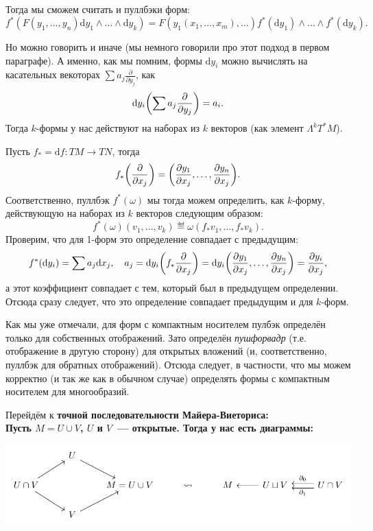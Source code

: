  	Тогда мы сможем считать и пуллбэки форм: 
 	\[
 		f^{*}(F(y_1, \ldots, y_n) \mathrm{d}y_1 \wedge \ldots \wedge \mathrm{d}y_k) = F(y_1(x_1, \ldots, x_m), \ldots) f^{*}(\mathrm{d}y_1) \wedge \ldots \wedge f^{*}(\mathrm{d}y_k).
 	\]

 	Но можно говорить и иначе (мы немного говорили про этот подход в первом параграфе). А именно, как мы помним, формы $\mathrm{d}y_i$ можно вычислять на касательных векоторах $\sum a_j \frac{\partial}{\partial y_j}$, как 
 	\[
 		\mathrm{d} y_i \lr*{\sum a_j \frac{\partial}{\partial y_j}} = a_i. 
 	\]
 	Тогда $k$-формы у нас действуют на наборах из $k$ векторов (как элемент $\Lambda^k T^*M$).

 	Пусть $f_* = \mathrm{d}f\colon TM \to TN$, тогда 
 	\[
 	 	f_*\lr*{\frac{\partial}{\partial x_j}} = \lr*{ \frac{\partial y_1}{\partial x_j}, \ldots, \frac{\partial y_n}{\partial x_j} }. 
 	 \] 
 	 Соответственно, пуллбэк  $f^*(\omega)$ мы тогда можем определить, как $k$-форму, действующую на наборах из $k$ векторов следующим образом: 
 	 \[
 	 	f^*(\omega)(v_1, \ldots, v_k) \eqdef \omega(f_*v_1, \ldots, f_* v_k). 
 	 \]
 	 Проверим, что для 1-форм это определение совпадает с предыдущим: 
 	 \[
 	 	f^*(\mathrm{d}y_i) = \sum a_j \mathrm{d}x_j, \quad a_j = \mathrm{d}y_i\lr*{f_* \frac{\partial}{\partial x_j}} = \mathrm{d}y_i\lr*{ \frac{\partial y_1}{\partial x_j}, \ldots, \frac{\partial y_n}{\partial x_j} } = \frac{\partial y_i}{\partial x_j},
 	 \]
 	  а этот коэффициент совпадает с тем, который был в предыдущем определении. Отсюда сразу следует, что это определение совпадает предыдущим и для  $k$-форм. 

 	  \begin{remark} 
 	  	Как мы уже отмечали, для форм с компактным носителем пулбэк определён только для собственных отображений. Зато определён \emph{пушфорвадр} (т.е. отображение в другую сторону) для открытых вложений (и, соответственно, пуллбэк для обратных отображений). Отсюда следует, в частности, что мы можем корректно (и так же как в обычном случае) определять формы с компактным носителем для многообразий. 
 	  \end{remark}

 	  Перейдём к \bf{точной последовательности Майера-Виеториса:}\\

 	  Пусть $M = U \cup V$, $U$  и $V$~--- открытые. Тогда у нас есть диаграммы: 

 	  \begin{center}
 	  	\includegraphics{lectures/7/pictures/cd_4.pdf}
 	  \end{center}

